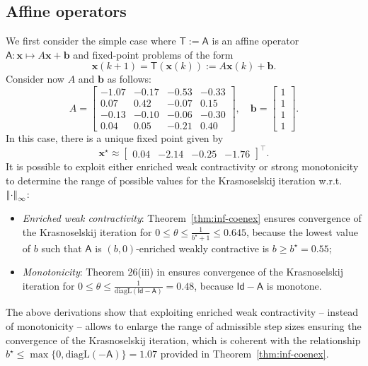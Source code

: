 \documentclass[journal,twoside,web]{ieeecolor}
\newcommand{\norm}[1]{{\left\vert\kern-0.25ex\left\vert #1\right\vert\kern-0.25ex\right\vert}}
\newcommand{\xb}{\boldsymbol{x}}
\newcommand{\bb}{\boldsymbol{b}}
\newcommand{\Ts}{\mathsf{T}}
\newcommand{\Is}{\mathsf{Id}}
\newcommand{\As}{\mathsf{A}}
\begin{document}
\subsection{Affine operators}\label{sec:aff}
%
We first consider the simple case where $\Ts:=\As$ is an affine operator ${\As:\xb\mapsto A\xb+\bb}$ and fixed-point problems of the form
%
\begin{equation*}
\xb(k+1) = \Ts(\xb(k)) := A\xb(k) + \bb.
\end{equation*}
%
Consider now $A$ and $\bb$ as follows:
%
$$
A = \left[\begin{array}{rrrr}
    -1.07& -0.17& -0.53& -0.33\\
    0.07&  0.42& -0.07&  0.15\\
    -0.13& -0.10&  -0.06& -0.30\\
    0.04&  0.05& -0.21&  0.40 
\end{array}\right],\quad \bb=\left[\begin{array}{r}
    1\\1\\1\\1
\end{array}\right].
$$
In this case, there is a unique fixed point given by
%
$$
\xb^\star\approx\begin{bmatrix}
    0.04& -2.14& -0.25& -1.76
\end{bmatrix}^\top.
$$
%
It is possible to exploit either enriched weak contractivity or strong monotonicity to determine the range of possible values for the Krasnoselskij iteration w.r.t. $\norm{\cdot}_{\infty}$:
\begin{itemize}
    \item \textit{Enriched weak contractivity}: Theorem~\ref{thm:inf-coenex} ensures convergence of the Krasnoselskij iteration for ${0\leq\theta \leq \frac{1}{b^\star+1}\leq 0.645}$, because the lowest value of $b$ such that $\As$ is $(b,0)$-enriched weakly contractive is $b\geq b^\star= 0.55$;
    \item \textit{Monotonicity}: Theorem 26(iii) in \cite{davydov2024non} ensures convergence of the Krasnoselskij iteration for ${0\leq\theta \leq \frac{1}{\text{diagL}(\Is-\As)}= 0.48}$, because $\Is-\As$ is monotone.
\end{itemize}
%
The above derivations show that exploiting enriched weak contractivity -- instead of monotonicity -- allows to enlarge the range of admissible step sizes ensuring the convergence of the Krasnoselskij iteration, which is coherent with the relationship $b^\star\leq\max\{0,\text{diagL}(-\As)\} =1.07$ provided in Theorem~\ref{thm:inf-coenex}.
\end{document}
